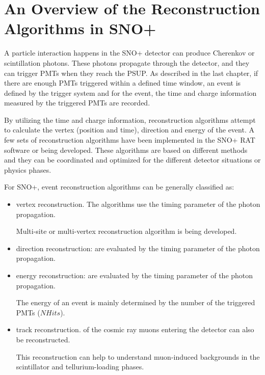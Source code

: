 
\section{An Overview of the Reconstruction Algorithms in SNO+}
A particle interaction happens in the SNO+ detector can produce Cherenkov or scintillation photons. These photons propagate through the detector, and they can trigger PMTs when they reach the PSUP. As described in the last chapter, if there are enough PMTs triggered within a defined time window, an event is defined by the trigger system and for the event, the time and charge information measured by the triggered PMTs are recorded.

By utilizing the time and charge information, reconstruction algorithms attempt to calculate the vertex (position and time), direction and energy of the event. A few sets of reconstruction algorithms have been implemented in the SNO+ RAT software or being developed. These algorithms are based on different methods and they can be coordinated and optimized for the different detector situations or physics phases.

For SNO+, event reconstruction algorithms can be generally classified as:
\begin{itemize}
	\item vertex reconstruction. The algorithms use the timing parameter of the photon propagation. 
	
	
Multi-site or multi-vertex reconstruction algorithm is being developed.
	
	\item direction reconstruction: are evaluated by the timing parameter of the photon propagation. 
	\item energy reconstruction: are evaluated by the timing parameter of the photon propagation. 

	The energy of an event is mainly determined by the number of the triggered PMTs ($NHits$).  
	\item track reconstruction.
	 of the cosmic ray muons entering the detector can also be reconstructed\cite{sorensen2018temperature}. 
	
	This reconstruction can help to understand muon-induced backgrounds in the scintillator and tellurium-loading phases.
\end{itemize}




